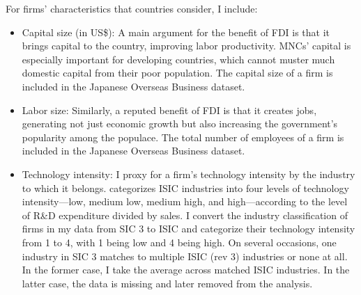 For firms' characteristics that countries consider, I include:

\begin{itemize}
\item Capital size (in US\$): A main argument for the benefit of FDI is that it brings capital to the country, improving labor productivity. MNCs' capital is especially important for developing countries, which cannot muster much domestic capital from their poor population. The capital size of a firm is included in the Japanese Overseas Business dataset.

\item Labor size: Similarly, a reputed benefit of FDI is that it creates jobs, generating not just economic growth but also increasing the government's popularity among the populace. The total number of employees of a firm is included in the Japanese Overseas Business dataset.

\item Technology intensity: I proxy for a firm's technology intensity by the industry to which it belongs. \citet{OECD2009} categorizes ISIC industries into four levels of technology intensity---low, medium low, medium high, and high---according to the level of R\&D expenditure divided by sales. I convert the industry classification of firms in my data from SIC 3 to ISIC and categorize their technology intensity from 1 to 4, with 1 being low and 4 being high. On several occasions, one industry in SIC 3 matches to multiple ISIC (rev 3) industries or none at all. In the former case, I take the average across matched ISIC industries. In the latter case, the data is missing and later removed from the analysis.
\end{itemize}
